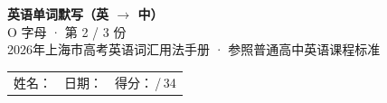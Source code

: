 \documentclass[10pt,a4paper]{article}
\begin{document}
\pagestyle{plain}

\begin{center}
{\LARGE\bfseries 英语单词默写（英 $\to$ 中）}\\[0.22em]
{\large O 字母 · 第 2 / 3 份}\\[0.18em]
{\small 2026年上海市高考英语词汇用法手册 · 参照普通高中英语课程标准}
\end{center}

\vspace{0.25em}
\noindent\begin{tabular}{@{}p{}@{}p{}@{}p{}@{}}
姓名：\underline{\hspace{2.0cm}} & 日期：\underline{\hspace{2.0cm}} & 得分：\underline{\hspace{1.3cm}}\,/\,34 \\
\end{tabular}

\vspace{0.3em}

\vspace{0.08em}
\end{document}
